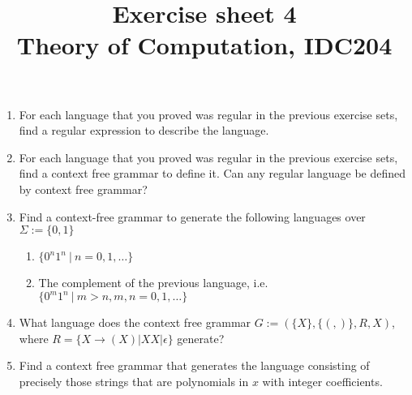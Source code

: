\documentclass[a4paper]{article}
\title{Exercise sheet 4\\ {\small Theory of Computation, IDC204} }
\date{}
\begin{document}
\maketitle
\begin{enumerate}
\item For each language that you proved was regular in the previous exercise sets, find a regular expression to describe the language.
\item For each language that you proved was regular in the previous exercise sets, find a context free grammar to define it. Can any regular language be defined by context free grammar?
\item Find a context-free grammar to generate the following languages over $\Sigma:=\{0,1\}$
  \begin{enumerate}
    \item $\{0^n1^n \ |\ n=0,1,\ldots\}$
        \item The complement of the previous language, i.e. $\{0^m1^n \ |\  m>n,m,n=0,1,\ldots\}$
  \end{enumerate}

\item What language does the context free grammar $G:=(\{X\},\{(,)\},R,X)$, where $R=\{X\to (X) | XX | ϵ\}$ generate?

\item Find a context free grammar that generates the language consisting of precisely those strings that are polynomials in $x$ with integer coefficients.
\end{enumerate}
\end{document}
